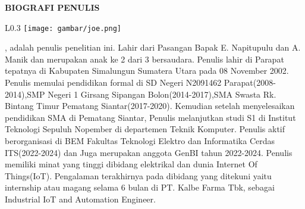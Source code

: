 \begin{center}
  \Large
  \textbf{BIOGRAFI PENULIS}
\end{center}


\vspace{2ex}

\begin{wrapfigure}{L}{0.3\textwidth}
  \centering
  \vspace{-3ex}
  \texttt{[image: gambar/joe.png]}
  \vspace{-4ex}
\end{wrapfigure}

\name{}, adalah penulis penelitian ini. Lahir dari Pasangan Bapak E. Napitupulu dan A. Manik dan merupakan anak ke 2 dari 3 bersaudara. Penulis lahir di Parapat tepatnya di Kabupaten Simalungun Sumatera Utara pada 08 November 2002. Penulis memulai pendidikan formal di SD Negeri N2091462 Parapat(2008-2014),SMP Negeri 1 Girsang Sipangan Bolon(2014-2017),SMA Swasta Rk. Bintang Timur Pematang Siantar(2017-2020). Kemudian setelah menyelesaikan pendidikan SMA di Pematang Siantar, Penulis melanjutkan studi S1 di Institut Teknologi Sepuluh Nopember di departemen Teknik Komputer. Penulis aktif berorganisasi di BEM Fakultas Teknologi Elektro dan Informatika Cerdas ITS(2022-2024) dan Juga merupakan anggota GenBI tahun 2022-2024. Penulis memiliki minat yang tinggi dibidang elektrikal dan dunia Internet Of Things(IoT). Pengalaman terakhirnya pada dibidang yang ditekuni yaitu internship atau magang selama 6 bulan di PT. Kalbe Farma Tbk, sebagai Industrial IoT and Automation Engineer.